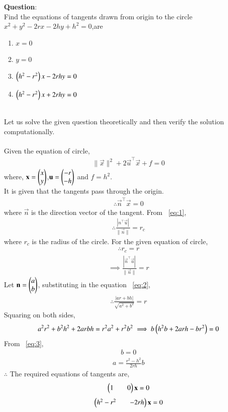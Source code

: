 \documentclass[journal]{IEEEtran}
\begin{document}
\textbf{Question}:\\
Find the equations of tangents drawn from origin to the circle $x^2+y^2-2rx-2hy+h^2=0$,are
\begin{multicols}{2}
\begin{enumerate}
    \item $x=0$
    \item $y=0$
    \item $\left(h^2-r^2\right)x-2rhy=0$
    \item $\left(h^2-r^2\right)x+2rhy=0$
\end{enumerate}
\end{multicols}
\solution \\
Let us solve the given question theoretically and then verify the solution computationally.\\
\\
Given the equation of circle,
\begin{align}
    \|\vec{x}\|^2+2\vec{u}^{\top}\vec{x}+f=0 \label{eq:1}
\end{align}
where, $\mathbf{x}=\begin{pmatrix}x\\y\end{pmatrix}$,$\mathbf{u}=\begin{pmatrix}-r\\-h\end{pmatrix}$ and $f=h^2$.\\ 
It is given that the tangents pass through the origin.
\begin{align}
    \therefore \vec{n}^{\top}\vec{x}=0
\end{align}
where $\vec{n}$ is the direction vector of the tangent.
From ~\eqref{eq:1},
\begin{align}
    \therefore \frac{|n^{\top}\vec{u}|}{\|\vec{n}\|}=r_c
\end{align}
where $r_c$ is the radius of the circle. For the given equation of circle,
\begin{align}
    \therefore r_c=r
\end{align}
\begin{align}
    \implies \frac{|\vec{n}^{\top}\vec{u}|}{\|\vec{n}\|}=r \label{eq:2}
\end{align}
Let $\mathbf{n}=\begin{pmatrix}a\\b\end{pmatrix}$, substituting in the equation ~\eqref{eq:2},
\begin{align}
    \therefore \frac{|ar+bh|}{\sqrt{a^2+b^2}}=r
\end{align}
Squaring on both sides,
\begin{align}
    a^2r^2+b^2h^2+2arbh=r^2a^2+r^2b^2 \implies b\left(h^2b+2arh-br^2\right)=0
    \label{eq:3}
\end{align}
\newpage
\vspace*{0.25cm}
From ~\eqref{eq:3},
\begin{align}
    b=0
\end{align}
\begin{align}
    a=\frac{r^2-h^2}{2rh}b
\end{align}
$\therefore$ The required equations of tangents are,
\begin{align}
    \begin{pmatrix}1&&0\end{pmatrix}\mathbf{x}=0
\end{align}
\begin{align}
    \begin{pmatrix}h^2-r^2&&-2rh\end{pmatrix}\mathbf{x}=0
\end{align}
\end{document}
